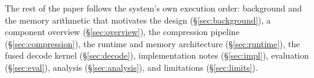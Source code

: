 The rest of the paper follows the system's own execution order: background and the memory
arithmetic that motivates the design (\S\ref{sec:background}), a component overview
(\S\ref{sec:overview}), the compression pipeline (\S\ref{sec:compression}), the runtime and
memory architecture (\S\ref{sec:runtime}), the fused decode kernel (\S\ref{sec:decode}),
implementation notes (\S\ref{sec:impl}), evaluation (\S\ref{sec:eval}), analysis
(\S\ref{sec:analysis}), and limitations (\S\ref{sec:limits}).
